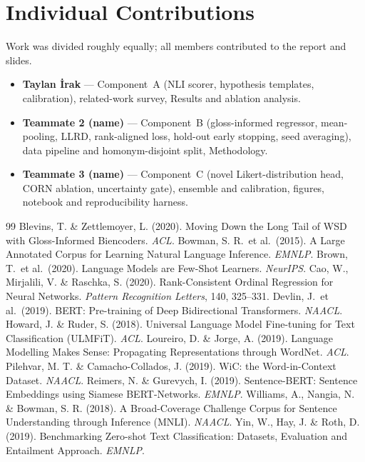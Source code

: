 \documentclass[11pt]{article}
\newcommand{\MEMBERA}{Taylan İrak}
\newcommand{\MEMBERB}{Teammate 2 (name)}
\newcommand{\MEMBERC}{Teammate 3 (name)}
\begin{document}
\section{Individual Contributions}
Work was divided roughly equally; all members contributed to the report and
slides.
\begin{itemize}
\item \textbf{\MEMBERA{}} --- Component~A (NLI scorer, hypothesis templates,
      calibration), related-work survey, Results and ablation analysis.
\item \textbf{\MEMBERB{}} --- Component~B (gloss-informed regressor,
      mean-pooling, LLRD, rank-aligned loss, hold-out early stopping, seed
      averaging), data pipeline and homonym-disjoint split, Methodology.
\item \textbf{\MEMBERC{}} --- Component~C (novel Likert-distribution head,
      CORN ablation, uncertainty gate), ensemble and calibration, figures,
      notebook and reproducibility harness.
\end{itemize}

\begin{thebibliography}{99}\small
{} Blevins, T. \& Zettlemoyer, L. (2020). Moving Down the Long
  Tail of WSD with Gloss-Informed Biencoders. \emph{ACL}.
 Bowman, S. R.\ et al.\ (2015). A Large Annotated Corpus for
  Learning Natural Language Inference. \emph{EMNLP}.
 Brown, T.\ et al.\ (2020). Language Models are Few-Shot
  Learners. \emph{NeurIPS}.
 Cao, W., Mirjalili, V. \& Raschka, S. (2020). Rank-Consistent
  Ordinal Regression for Neural Networks. \emph{Pattern Recognition Letters},
  140, 325--331.
 Devlin, J.\ et al.\ (2019). BERT: Pre-training of Deep
  Bidirectional Transformers. \emph{NAACL}.
 Howard, J. \& Ruder, S. (2018). Universal Language Model
  Fine-tuning for Text Classification (ULMFiT). \emph{ACL}.
 Loureiro, D. \& Jorge, A. (2019). Language Modelling Makes
  Sense: Propagating Representations through WordNet. \emph{ACL}.
 Pilehvar, M. T. \& Camacho-Collados, J. (2019). WiC: the
  Word-in-Context Dataset. \emph{NAACL}.
 Reimers, N. \& Gurevych, I. (2019). Sentence-BERT: Sentence
  Embeddings using Siamese BERT-Networks. \emph{EMNLP}.
 Williams, A., Nangia, N. \& Bowman, S. R. (2018). A
  Broad-Coverage Challenge Corpus for Sentence Understanding through Inference
  (MNLI). \emph{NAACL}.
 Yin, W., Hay, J. \& Roth, D. (2019). Benchmarking Zero-shot Text
  Classification: Datasets, Evaluation and Entailment Approach. \emph{EMNLP}.
\end{thebibliography}
\end{document}
